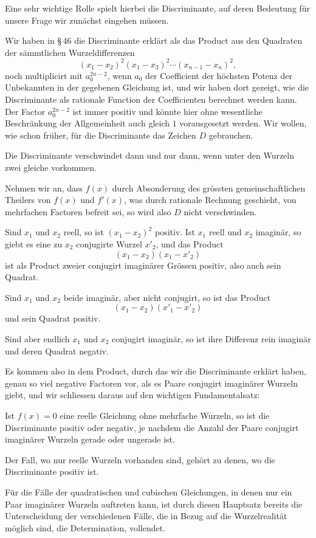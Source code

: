\documentclass[11pt]{article}
\begin{document}
Eine sehr wichtige Rolle spielt hierbei die Discriminante, auf deren Bedeutung f\"ur unsere Frage wir zun\"achst eingehen m\"ussen.

Wir haben in \S\,46 die Discriminante erkl\"art als das Product aus den Quadraten der s\"ammtlichen Wurzeldifferenzen
\[
 (x_1-x_2)^2(x_1-x_3)^2\cdots (x_{n-1}-x_n)^2,
\]
noch multiplicirt mit $a_0^{2n-2}$, wenn $a_0$ der Coefficient der h\"ochsten Potenz der Unbekannten in der gegebenen Gleichung ist, und wir haben dort gezeigt, wie die Discriminante als rationale Function der Coefficienten berechnet werden kann. Der Factor $a_0^{2n-2}$ ist immer positiv und k\"onnte hier ohne wesentliche Beschr\"ankung der Allgemeinheit auch gleich $1$ vorausgesetzt werden. Wir wollen, wie schon fr\"uher, f\"ur die Discriminante das Zeichen $D$ gebrauchen.

Die Discriminante verschwindet dann und nur dann, wenn unter den Wurzeln zwei gleiche vorkommen.

Nehmen wir an, dass $f(x)$ durch Absonderung des gr\"ossten gemeinschaftlichen Theilers von $f(x)$ und $f'(x)$, was durch rationale Rechnung geschieht, von mehrfachen Factoren befreit sei, so wird also $D$ nicht verschwinden.

Sind $x_1$ und $x_2$ reell, so ist $(x_1-x_2)^2$ positiv. Ist $x_1$ reell und $x_2$ imagin\"ar, so giebt es eine zu $x_2$ conjugirte Wurzel $x'_2$, und das Product
\[
        (x_1-x_2)(x_1-x'_2)
\]
ist als Product zweier conjugirt imagin\"arer Gr\"ossen positiv, also auch sein Quadrat.

Sind $x_1$ und $x_2$ beide imagin\"ar, aber nicht conjugirt, so ist das Product
\[
        (x_1-x_2)(x'_1-x'_2)
\]
und sein Quadrat positiv.

Sind aber endlich $x_1$ und $x_2$ conjugirt imagin\"ar, so ist ihre Differenz rein imagin\"ar und deren Quadrat negativ.

Es kommen also in dem Product, durch das wir die Discriminante erkl\"art haben, genau so viel negative Factoren vor, als es Paare conjugirt imagin\"arer Wurzeln giebt, und wir schliessen daraus auf den wichtigen Fundamentalsatz:

Ist $f(x)=0$ eine reelle Gleichung ohne mehrfache Wurzeln, so ist die Discriminante positiv oder negativ, je nachdem die Anzahl der Paare conjugirt imagin\"arer Wurzeln gerade oder ungerade ist.

Der Fall, wo nur reelle Wurzeln vorhanden sind, geh\"ort zu denen, wo die Discriminante positiv ist.

F\"ur die F\"alle der quadratischen und cubischen Gleichungen, in denen nur ein Paar imagin\"arer Wurzeln auftreten kann, ist durch diesen Hauptsatz bereits die Unterscheidung der verschiedenen F\"alle, die in Bezug auf die Wurzelrealit\"at m\"oglich sind, die Determination, vollendet.
\end{document}
